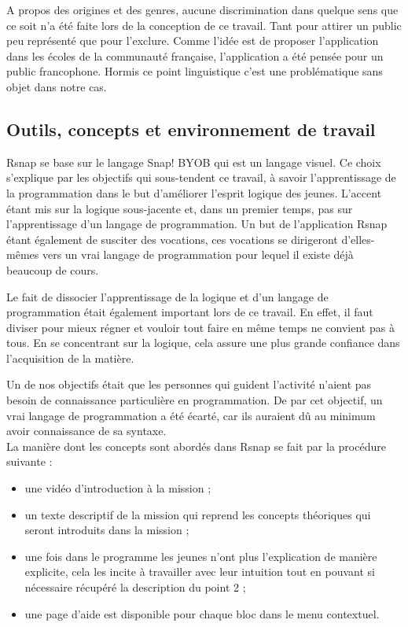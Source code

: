 A propos des origines et des genres, aucune discrimination dans quelque sens que ce soit n'a été faite lors de la conception de ce travail. Tant pour attirer un public peu représenté que pour l'exclure. Comme l'idée est de proposer l'application dans les écoles de la communauté française, l'application a été pensée pour un public francophone. Hormis ce point linguistique c'est une problématique sans objet dans notre cas.

\subsection{Outils, concepts et environnement de travail} 
\label{SNAP}
Rsnap se base sur le langage Snap! BYOB qui est un langage visuel. Ce choix s'explique par les objectifs qui sous-tendent ce travail, à savoir l'apprentissage de la programmation dans le but d'améliorer l'esprit logique des jeunes. L'accent étant mis sur la logique sous-jacente et, dans un premier temps, pas sur l'apprentissage d'un langage de programmation. Un but de l'application Rsnap étant également de susciter des vocations, ces vocations se dirigeront d'elles-mêmes vers un vrai langage de programmation pour lequel il existe déjà beaucoup de cours.

Le fait de dissocier l'apprentissage de la logique et d'un langage de programmation était également important lors de ce travail. En effet, il faut diviser pour mieux régner et vouloir tout faire en même temps ne convient pas à tous. En se concentrant sur la logique, cela assure une plus grande confiance dans l'acquisition de la matière.

Un de nos objectifs était que les personnes qui guident l'activité n'aient pas besoin de connaissance particulière en programmation. De par cet objectif, un vrai langage de programmation a été écarté, car ils auraient dû au minimum avoir connaissance de sa syntaxe.\\

La manière dont les concepts sont abordés dans Rsnap se fait par la procédure suivante :
\begin{itemize}
	\item une vidéo d'introduction à la mission ;
	\item un texte descriptif de la mission qui reprend les concepts théoriques qui seront introduits dans la mission ;
	\item une fois dans le programme les jeunes n'ont plus l'explication de manière explicite, cela les incite à travailler avec leur intuition tout en pouvant si nécessaire récupéré la description du point 2 ;
	\item une page d'aide est disponible pour chaque bloc dans le menu contextuel.
\end{itemize}

